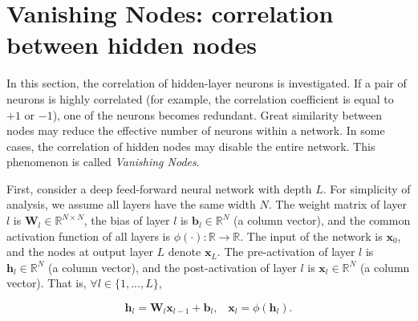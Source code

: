 \chapter{Vanishing Nodes: correlation between hidden nodes}
\label{why}

In this section, the correlation of hidden-layer neurons is investigated.
If a pair of neurons is highly correlated (for example, the correlation coefficient is equal to $+1$ or $-1$), one of the neurons becomes redundant.
Great similarity between nodes may reduce the effective number of neurons within a network.
In some cases, the correlation of hidden nodes may disable the entire network. This phenomenon is called \textit{Vanishing Nodes}.


First, consider a deep feed-forward neural network with depth $L$.
For simplicity of analysis, we assume all layers have the same width $N$.
The weight matrix of layer $l$ is $\mathbf{W}_l\in \mathbb{R}^{N\times N}$, the bias of layer $l$ is $\mathbf{b}_l\in \mathbb{R}^N$ (a column vector), and the common activation function of all layers is $\phi(\cdot):\mathbb{R}\rightarrow \mathbb{R}$. The input of the network is $\mathbf{x}_0$, and the nodes at output layer $L$ denote $\mathbf{x}_L$. The pre-activation of layer $l$ is $\mathbf{h}_l\in \mathbb{R}^N$ (a column vector), and the post-activation of layer $l$ is $\mathbf{x}_l\in \mathbb{R}^N$ (a column vector). That is, $\forall l \in \{1, ..., L\}$,

\begin{equation}
    \mathbf{h}_l=\mathbf{W}_l\mathbf{x}_{l-1}+\mathbf{b}_l,\;\;\;
    \mathbf{x}_{l}=\phi(\mathbf{h}_l).
\label{network_eqn}
\end{equation}

